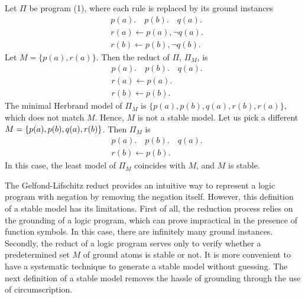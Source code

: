 Let $\Pi$ be program (1), where each rule is replaced by its ground instances 
\begin{align*}
    & p(a). \hspace{1em} p(b). \hspace{1em} q(a). \\
    & r(a) \leftarrow p(a), \neg q(a). \\ 
    & r(b) \leftarrow p(b), \neg q(b).
\end{align*}
Let $M = \{p(a),r(a)\}$. Then the reduct of $\Pi$, $\Pi _M$, is 
\begin{align*}
    & p(a). \hspace{1em} p(b). \hspace{1em} q(a). \\
    & r(a) \leftarrow p(a). \\ 
    & r(b) \leftarrow p(b).
\end{align*}
The minimal Herbrand model of $\Pi _M$ is $\{p(a),p(b),q(a),r(b),r(a)\}$, which does not 
match $M$. Hence, $M$ is not a stable model. Let us pick a different 
$M = \{p(a),p(b),q(a),\\r(b)\}$. Then $\Pi _M$ is
\begin{align*}
    & p(a). \hspace{1em} p(b). \hspace{1em} q(a). \\
    & r(b) \leftarrow p(b). 
\end{align*}
In this case, the least model of $\Pi _M$ coincides with $M$, and $M$ is stable.

The Gelfond-Lifschitz reduct provides an intuitive way to represent a logic 
program with negation by removing the negation itself. However, this definition 
of a stable model has its limitations. First of all, the reduction process relies 
on the grounding of a logic program, which can prove impractical in the presence of 
function symbols. In this case, there are infinitely many ground instances. 
Secondly, the reduct of a logic program serves only to verify whether a predetermined 
set $M$ of ground atoms is stable or not. It is more convenient to have a systematic 
technique to generate a stable model without guessing. The next definition of a stable 
model removes the hassle of grounding through the use of circumscription.

